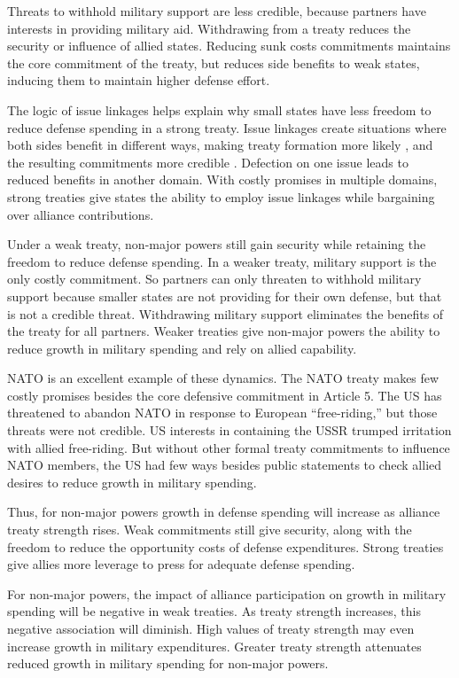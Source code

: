 \documentclass[12pt]{article}
\begin{document}
Threats to withhold military support are less credible, because partners have interests in providing military aid. 
Withdrawing from a treaty reduces the security or influence of allied states. 
Reducing sunk costs commitments maintains the core commitment of the treaty, but reduces side benefits to weak states, inducing them to maintain higher defense effort. 


The logic of issue linkages helps explain why small states have less freedom to reduce defense spending in a strong treaty. 
Issue linkages create situations where both sides benefit in different ways, making treaty formation more likely \citep{Poast2012}, and the resulting commitments more credible \citep{Poast2013}. 
Defection on one issue leads to reduced benefits in another domain. 
With costly promises in multiple domains, strong treaties give states the ability to employ issue linkages while bargaining over alliance contributions. 


Under a weak treaty, non-major powers still gain security while retaining the freedom to reduce defense spending.    
In a weaker treaty, military support is the only costly commitment. 
So partners can only threaten to withhold military support because smaller states are not providing for their own defense, but that is not a credible threat. 
Withdrawing military support eliminates the benefits of the treaty for all partners. 
Weaker treaties give non-major powers the ability to reduce growth in military spending and rely on allied capability.


NATO is an excellent example of these dynamics. 
The NATO treaty makes few costly promises besides the core defensive commitment in Article 5.
The US has threatened to abandon NATO in response to European ``free-riding,'' but those threats were not credible. 
US interests in containing the USSR trumped irritation with allied free-riding.  
But without other formal treaty commitments to influence NATO members, the US had few ways besides public statements to check allied desires to reduce growth in military spending. 


Thus, for non-major powers growth in defense spending will increase as alliance treaty strength rises. 
Weak commitments still give security, along with the freedom to reduce the opportunity costs of defense expenditures. 
Strong treaties give allies more leverage to press for adequate defense spending. 


For non-major powers, the impact of alliance participation on growth in military spending will be negative in weak treaties.
As treaty strength increases, this negative association will diminish. 
High values of treaty strength may even increase growth in military expenditures. 
Greater treaty strength attenuates reduced growth in military spending for non-major powers. 
\end{document}
